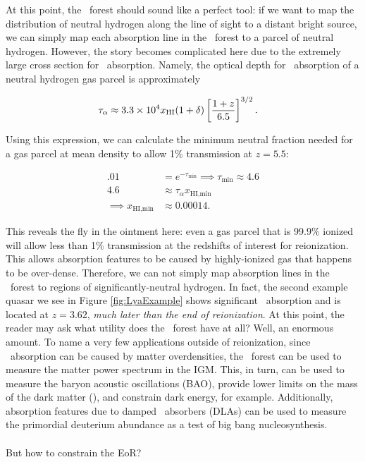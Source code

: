 At this point, the \lya\ forest should sound like a perfect tool: if we want to map the distribution of neutral hydrogen along the line of sight to a distant bright source, we can simply map each absorption line in the \lya\ forest to a parcel of neutral hydrogen. However, the story becomes complicated here due to the extremely large cross section for \lya\ absorption. Namely, the optical depth for \lya\ absorption of a neutral hydrogen gas parcel is approximately

\begin{align}
\tau_{\alpha} &\approx 3.3 \times 10^{4} x_{\text{HI}} (1 + \delta) \left[\dfrac{1+z}{6.5}\right]^{3/2}. \label{eq:tauGP}
\end{align}

Using this expression, we can calculate the minimum neutral fraction needed for a gas parcel at mean density to allow 1\% transmission at $z = 5.5$:

\begin{align}
.01 &= e^{-\tau_{\text{min}}} \implies \tau_{\text{min}} \approx 4.6\\
4.6 &\approx \tau_{\alpha} x_{\text{HI,min}} \\
\implies x_{\text{HI,min}} &\approx 0.00014.
\end{align}


This reveals the fly in the ointment here: even a gas parcel that is 99.9\% ionized will allow less than 1\% transmission at the redshifts of interest for reionization. This allows absorption features to be caused by highly-ionized gas that happens to be over-dense. Therefore, we can not simply map absorption lines in the \lya\ forest to regions of significantly-neutral hydrogen. In fact, the second example quasar we see in Figure \ref{fig:LyaExample} shows significant \lya\ absorption and is located at $z = 3.62$, \textit{much later than the end of reionization}. At this point, the reader may ask what utility does the \lya\ forest have at all? Well, an enormous amount. To name a very few applications outside of reionization, since \lya\ absorption can be caused by matter overdensities, the \lya\ forest can be used to measure the matter power spectrum in the IGM. This, in turn, can be used to measure the baryon acoustic oscillations (BAO), provide lower limits on the mass of the dark matter (\citealt{Viel:2013fqw}), and constrain dark energy, for example. Additionally, absorption features due to damped \lya\ absorbers (DLAs) can be used to measure the primordial deuterium abundance as a test of big bang nucleosynthesis.\\
\textcolor{white}{suspense!}\\
\noindent But how to constrain the EoR?


